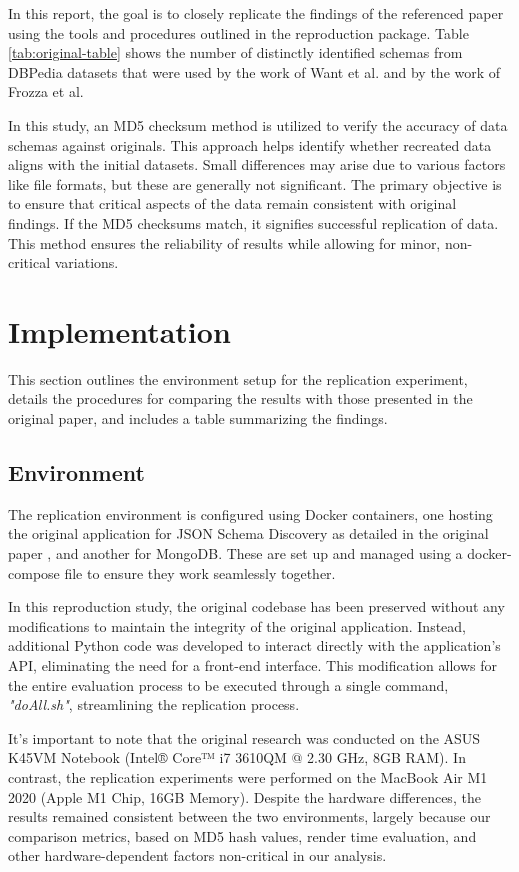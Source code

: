 \documentclass[sigconf, nonacm]{acmart}
\begin{document}
In this report, the goal is to closely replicate the findings of the referenced paper using the tools and procedures outlined in the reproduction package. Table \ref{tab:original-table} shows the number of distinctly identified schemas from DBPedia datasets that were used by the work of Want et al. \cite{WangSchemaManagement} and by the work of Frozza et al. \cite{JsonSchemaDiscovery}

In this study, an MD5 checksum method is utilized to verify the accuracy of data schemas against originals. This approach helps identify whether recreated data aligns with the initial datasets. Small differences may arise due to various factors like file formats, but these are generally not significant. The primary objective is to ensure that critical aspects of the data remain consistent with original findings. If the MD5 checksums match, it signifies successful replication of data. This method ensures the reliability of results while allowing for minor, non-critical variations.


\section{Implementation}
This section outlines the environment setup for the replication experiment, details the procedures for comparing the results with those presented in the original paper, and includes a table summarizing the findings.

\subsection{Environment}
The replication environment is configured using Docker containers, one hosting the original application for JSON Schema Discovery as detailed in the original paper \cite{JsonSchemaDiscovery}, and another for MongoDB. These are set up and managed using a docker-compose file to ensure they work seamlessly together.

In this reproduction study, the original codebase has been preserved without any modifications to maintain the integrity of the original application. Instead, additional Python code was developed to interact directly with the application's API, eliminating the need for a front-end interface. This modification allows for the entire evaluation process to be executed through a single command, \textit{"doAll.sh"}, streamlining the replication process.

It's important to note that the original research was conducted on the ASUS K45VM Notebook (Intel® Core™ i7 3610QM @ 2.30 GHz, 8GB RAM). In contrast, the replication experiments were performed on the MacBook Air M1 2020 (Apple M1 Chip, 16GB Memory). Despite the hardware differences, the results remained consistent between the two environments, largely because our comparison metrics, based on MD5 hash values, render time evaluation, and other hardware-dependent factors non-critical in our analysis.
\end{document}
